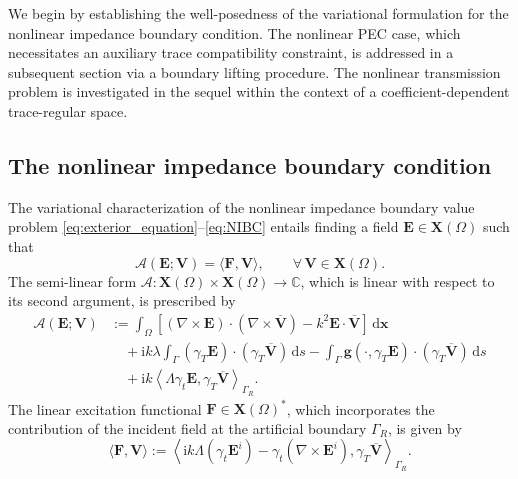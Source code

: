 \documentclass[12pt,reqno]{amsart}
\theoremstyle{definition}
\numberwithin{equation}{section}
\begin{document}
We begin by establishing the well-posedness of the variational formulation for the nonlinear impedance boundary condition. The nonlinear PEC case, which necessitates an auxiliary trace compatibility constraint, is addressed in a subsequent section via a boundary lifting procedure. The nonlinear transmission problem is investigated in the sequel within the context of a coefficient-dependent trace-regular space.

\subsection{The nonlinear impedance boundary condition}

The variational characterization of the nonlinear impedance boundary value problem \eqref{eq:exterior_equation}--\eqref{eq:NIBC} entails finding a field $\mathbf{E} \in \mathbf{X}(\Omega)$ such that
\begin{equation}
\label{eq:main_formulation}
\mathcal{A}(\mathbf{E}; \mathbf{V}) = \langle \mathbf{F}, \mathbf{V} \rangle, \qquad \forall \, \mathbf{V} \in \mathbf{X}(\Omega).
\end{equation}
The semi-linear form $\mathcal{A} \colon \mathbf{X}(\Omega) \times \mathbf{X}(\Omega) \to \mathbb{C}$, which is linear with respect to its second argument, is prescribed by
\begin{equation}
\label{sef}
\begin{aligned}
\mathcal{A}(\mathbf{E}; \mathbf{V}) 
&:= \int_\Omega \left[ (\nabla \times \mathbf{E}) \cdot (\nabla \times \overline{\mathbf{V}}) - k^2 \mathbf{E} \cdot \overline{\mathbf{V}} \right] \, \mathrm{d}\boldsymbol {x} \\
&\quad + \mathrm{i}k\lambda \int_\Gamma (\gamma_T \mathbf{E}) \cdot (\gamma_T \overline{\mathbf{V}}) \, \mathrm{d}s - \int_\Gamma \mathbf{g}(\cdot, \gamma_T \mathbf{E}) \cdot (\gamma_T \overline{\mathbf{V}}) \, \mathrm{d}s \\
&\quad + \mathrm{i}k \left\langle \Lambda \gamma_t \mathbf{E}, \gamma_T \overline{\mathbf{V}} \right\rangle_{\Gamma_R}.
\end{aligned}
\end{equation}
The linear excitation functional $\mathbf{F} \in \mathbf{X}(\Omega)^*$, which incorporates the contribution of the incident field at the artificial boundary $\Gamma_R$, is given by
\begin{equation}
\label{eq:F_definition}
\langle \mathbf{F}, \mathbf{V} \rangle := \left\langle \mathrm{i}k \Lambda(\gamma_t \mathbf{E}^i) - \gamma_t (\nabla \times \mathbf{E}^i), \gamma_T \overline{\mathbf{V}} \right\rangle_{\Gamma_R}.
\end{equation}
\end{document}
